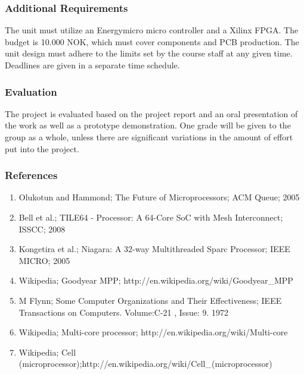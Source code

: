 \subsubsection{Additional Requirements}
The unit must utilize an Energymicro micro controller and a Xilinx FPGA. The budget is 10.000 NOK, 
which must cover components and PCB production. The unit design must adhere to the limits set by 
the course staff at any given time. Deadlines are given in a separate time schedule.

\subsubsection{Evaluation}
The project is evaluated based on the project report and an oral presentation of the work as well as a 
prototype  demonstration.  One  grade  will  be  given  to  the  group  as  a  whole,  unless  there  are 
significant variations in the amount of effort put into the project.

\subsubsection{References}

\begin{enumerate}
	\item Olukotun and Hammond; The Future of Microprocessors; ACM Queue; 2005 
\item Bell et al.; TILE64 - Processor: A 64-Core SoC with Mesh Interconnect; ISSCC; 2008  
\item Kongetira et al.; Niagara: A 32-way Multithreaded Sparc Processor; IEEE MICRO; 2005 
\item Wikipedia; Goodyear MPP; http://en.wikipedia.org/wiki/Goodyear\_MPP 
\item M Flynn; Some Computer Organizations and Their Effectiveness; IEEE Transactions on Computers. Volume:C-21 ,  Issue: 9. 1972 
\item Wikipedia; Multi-core processor; http://en.wikipedia.org/wiki/Multi-core 
\item Wikipedia; Cell (microprocessor);http://en.wikipedia.org/wiki/Cell\_(microprocessor) 
\end{enumerate}
